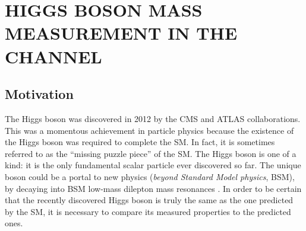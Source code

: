 \chapter{HIGGS BOSON MASS MEASUREMENT IN THE \texorpdfstring{\hzzfourl}{H to ZZ to 4l} CHANNEL}
\label{ch:higgs_mass}
\section{Motivation}
The Higgs boson was discovered in 2012 by the CMS and ATLAS collaborations.
This was a momentous achievement in particle physics because the existence of the Higgs boson was required to complete the SM.
In fact, it is sometimes referred to as the ``missing puzzle piece'' of the SM.
The Higgs boson is one of a kind: it is the only fundamental scalar particle ever discovered so far.
The unique boson could be a portal to new physics (\emph{beyond Standard Model physics}, BSM), \eg by decaying into BSM low-mass dilepton mass resonances
.
In order to be certain that the recently discovered Higgs boson is truly the same as the one predicted by the SM, it is necessary to compare its measured properties to the predicted ones.




